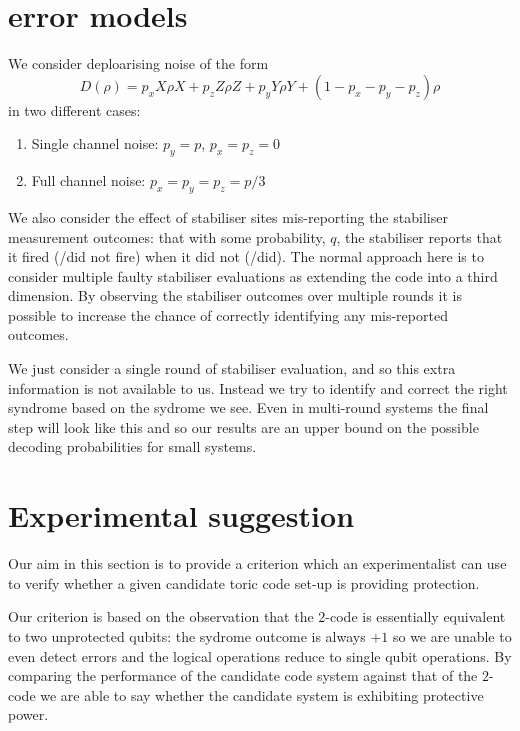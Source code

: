\section{error models}

We consider deploarising noise of the form
\begin{equation} \label{noise_eq}
  D(\rho) = p_x X\rho X +  p_z Z\rho Z + p_y Y\rho Y  + (1- p_x - p_y - p_z)\rho
\end{equation}
in two different cases:
\begin{enumerate}
  \item Single channel noise: $p_y = p$, $p_x = p_z = 0$
  \item Full channel noise: $p_x = p_y = p_z = p/3$
\end{enumerate}

We also consider the effect of stabiliser sites mis-reporting the stabiliser measurement outcomes: that with some probability, $q$, the stabiliser reports that it fired (/did not fire) when it did not (/did). The normal approach here is to consider multiple faulty stabiliser evaluations as extending the code into a third dimension. By observing the stabiliser outcomes over multiple rounds it is possible to increase the chance of correctly identifying any mis-reported outcomes.

We just consider a single round of stabiliser evaluation, and so this extra information is not available to us. Instead we try to identify and correct the right syndrome based on the sydrome we see. Even in multi-round systems the final step will look like this and so our results are an upper bound on the possible decoding probabilities for small systems.

\section{Experimental suggestion}

Our aim in this section is to provide a criterion which an experimentalist can use to verify whether a given candidate toric code set-up is providing protection.

Our criterion is based on the observation that the $2$-code is essentially equivalent to two unprotected qubits: the sydrome outcome is always $+1$ so we are unable to even detect errors and the logical operations reduce to single qubit operations. By comparing the performance of the candidate code system against that of the $2$-code we are able to say whether the candidate system is exhibiting protective power. 

